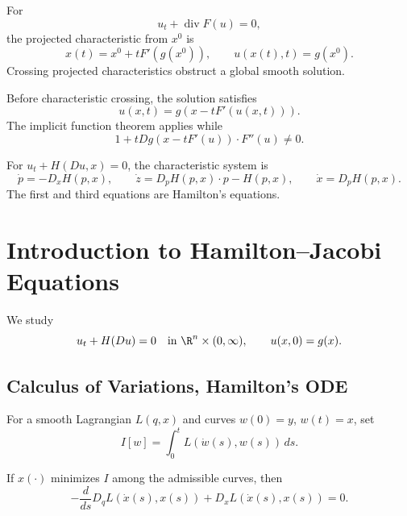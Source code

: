 \begin{example}
\label{ex:characteristics-conservation-laws}
For
\[
u_t+\operatorname{div}F(u)=0,
\]
the projected characteristic from $x^0$ is
\[
x(t)=x^0+tF'(g(x^0)),\qquad u(x(t),t)=g(x^0).
\]
Crossing projected characteristics obstruct a global smooth solution.
\end{example}

\begin{remark}
\label{rem:implicit-formula-conservation-law}
Before characteristic crossing, the solution satisfies
\[
u(x,t)=g(x-tF'(u(x,t))).
\]
The implicit function theorem applies while
\[
1+tDg(x-tF'(u))\cdot F''(u)\ne0.
\]
\end{remark}

\begin{example}
\label{ex:characteristics-hamilton-jacobi}
For $u_t+H(Du,x)=0$, the characteristic system is
\[
\dot p=-D_xH(p,x),\qquad
\dot z=D_pH(p,x)\cdot p-H(p,x),\qquad
\dot x=D_pH(p,x).
\]
The first and third equations are Hamilton's equations.
\end{example}

\section{Introduction to Hamilton--Jacobi Equations}
\label{sec:hamilton-jacobi-intro}

We study
\[
u_t+H(Du)=0\quad\text{in }\R^n\times(0,\infty),\qquad
u(x,0)=g(x).
\]

\subsection{Calculus of Variations, Hamilton's ODE}
\label{sec:calculus-of-variations-hamiltons-ode}

For a smooth Lagrangian $L(q,x)$ and curves $w(0)=y$, $w(t)=x$, set
\[
I[w]=\int_0^tL(\dot w(s),w(s))\,ds.
\]

\begin{theorem}
\label{thm:euler-lagrange-equations}
If $x(\cdot)$ minimizes $I$ among the admissible curves, then
\[
-\frac d{ds}D_qL(\dot x(s),x(s))+D_xL(\dot x(s),x(s))=0.
\]
\end{theorem}

